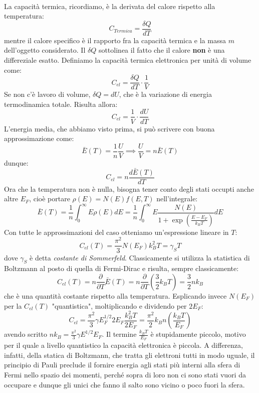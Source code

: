 \documentclass{book}
\begin{document}
            \paragraph{}
                La capacità termica, ricordiamo, è la derivata del calore rispetto alla temperatura:
                $$C_{Termica} = \frac{\delta Q}{d T}$$
                mentre il calore specifico è il rapporto fra la capacità termica e la massa $m$ dell'oggetto considerato. Il $\delta Q$ sottolinea il fatto che il calore \textbf{non} è una differeziale esatto. 
                Definiamo la capacità termica elettronica per unità di volume come:
                $$C_{el} = \frac{\delta Q}{d T} \cdot\frac{1}{V}$$
                Se non c'è lavoro di volume, $\delta Q = dU$, che è la variazione di energia termodinamica totale. Risulta allora:
                $$C_{el} = \frac{1}{V} \cdot \frac{dU}{dT}$$
                L'energia media, che abbiamo visto prima, si può scrivere con buona approssimazione come:
                $$\bar{E}(T) = \frac{1}{n} \frac{U}{V} \implies \frac{U}{V} = n\bar{E}(T)$$
                dunque:
                $$C_{el} = n \frac{d\bar{E}(T)}{dT}$$
                Ora che la temperatura non è nulla, bisogna tener conto degli stati occupti anche altre $E_{F}$, cioè portare $\rho(E) = N(E)f(E,T)$ nell'integrale:
                $$\bar{E}(T) = \frac{1}{n} \int_{0} ^{\infty} E \rho(E)dE = \frac{1}{n} \int_{0} ^{\infty} E\frac{N(E)}{1+\exp{(\frac{E-E_{F}}{k_{B}T})}}dE$$
                Con tutte le approssimazioni del caso otteniamo un'espressione lineare in $T$:
                $$C_{el}(T) = \frac{\pi ^{2}}{3} N(E_{F}) k_{B} ^{2} T = \gamma_{S} T$$
                dove $\gamma_{S}$ è detta \textit{costante di Sommerfeld}.
                Classicamente si utilizza la statistica di Boltzmann al posto di quella di Fermi-Dirac e risulta, sempre classicamente:
                $$C_{el}(T) = n \frac{\partial}{\partial T} \bar{E}(T) = n \frac{\partial}{\partial T} (\frac{3}{2}k_{B}T) = \frac{3}{2}nk_{B}$$
                che è una quantità costante rispetto alla temperatura.
                Esplicando invece $N(E_{F})$ per la $C_{el}(T)$ "quantistica", moltiplicando e dividendo per $2E_{F}$:
                $$C_{el} = \frac{\pi ^{2}}{3} \gamma E_{F} ^{1/2}2E_{F} \frac{k_{B} ^{2}T}{2E_{F}} = \frac{\pi ^{2}}{2}k_{B} n(\frac{k_{B}T}{E_{F}})$$
                avendo scritto $nk_{B} =\displaystyle \frac{\pi^{2}}{3} \gamma E^{1/2} E_{F}$.
                Il termine $\frac{k_{B}T}{E_{F}}$ è stupidamente piccolo, motivo per il quale a livello quantistico la capacità elettronica è piccola. A differenza, infatti, della statica di Boltzmann, che tratta gli elettroni tutti in modo uguale, il principio di Pauli preclude il fornire energia agli stati più interni alla sfera di Fermi nello spazio dei momenti, perché sopra di loro non ci sono stati vuori da occupare e dunque gli unici che fanno il salto sono vicino o poco fuori la sfera.
\end{document}
